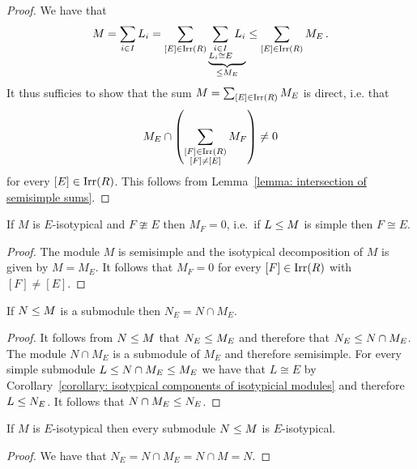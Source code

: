 \begin{proof}
  We have that
  \[
              M
    =         \sum_{i \in I} L_i
    =         \sum_{[E] \in \operatorname{Irr}(R)}
              \underbrace{
                \sum_{\substack{i \in I \\ L_i \cong E}} L_i
              }_{\leq M_E}
    \leq \sum_{[E] \in \operatorname{Irr}(R)} M_E \,.
  \]
  It thus sufficies to show that the sum $M  = \sum_{[E] \in \operatorname{Irr}(R)} M_E$ is direct, i.e. that
  \[
          M_E
          \cap 
          \left(
            \sum_{\substack{[F] \in \operatorname{Irr}(R) \\ [F] \neq [E]}} M_F
          \right)
    \neq  0
  \]
  for every $[E] \in \operatorname{Irr}(R)$.
  This follows from Lemma~\ref{lemma: intersection of semisimple sums}.
\end{proof}


\begin{corollary}
  \label{corollary: isotypical components of isotypicial modules}
  If $M$ is $E$-isotypical and $F \ncong E$ then $M_F = 0$, i.e.\ if $L \leq M$ is simple then $F \cong E$.
\end{corollary}


\begin{proof}
  The module $M$ is semisimple and the isotypical decomposition of $M$ is given by $M = M_E$.
  It follows that $M_F = 0$ for every $[F] \in \operatorname{Irr}(R)$ with $[F] \neq [E]$.
\end{proof}


\begin{lemma}
  If $N \leq M$ is a submodule then $N_E = N \cap M_E$.
\end{lemma}


\begin{proof}
  It follows from $N \leq M$ that $N_E \leq M_E$ and therefore that $N_E \leq N \cap M_E$.
  The module $N \cap M_E$ is a submodule of $M_E$ and therefore semisimple.
  For every simple submodule $L \leq N \cap M_E \leq M_E$ we have that $L \cong E$ by Corollary~\ref{corollary: isotypical components of isotypicial modules} and therefore $L \leq N_E$.
  It follows that $N \cap M_E \leq N_E$.
\end{proof}


\begin{corollary}
  If $M$ is $E$-isotypical then every submodule $N \leq M$ is $E$-isotypical.
\end{corollary}


\begin{proof}
  We have that $N_E = N \cap M_E = N \cap M = N$.
\end{proof}


